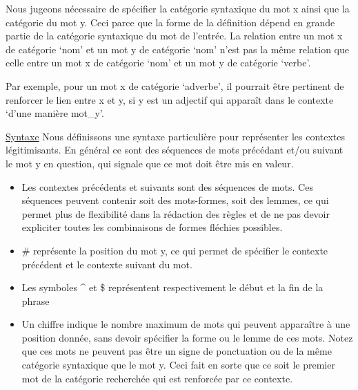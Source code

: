 Nous jugeons nécessaire de spécifier la catégorie syntaxique du mot x ainsi que 
la catégorie du mot y. Ceci parce que la forme de la définition dépend en grande 
partie de la catégorie syntaxique du mot de l'entrée. La relation entre un 
mot x de catégorie \lq{nom}\rq{} et un mot y de catégorie \lq{nom}\rq{} n'est pas la même 
relation que celle entre un mot x de catégorie \lq{nom}\rq{} et un mot y de 
catégorie \lq{verbe}\rq.

Par exemple, pour un mot x de catégorie \lq{adverbe}\rq, il pourrait être 
pertinent de renforcer le lien entre x et y, si y est un adjectif qui apparaît 
dans le contexte \lq{d'une manière mot\_y}\rq.

\underline{Syntaxe}\newline
Nous définissons une syntaxe particulière pour représenter les contextes 
légitimisants. En général ce sont des séquences de mots précédant et/ou suivant 
le mot y en question, qui signale que ce mot doit être mis en valeur.\newline

\begin{itemize}
    \item{Les contextes précédents et suivants sont des séquences de mots. Ces 
    séquences peuvent contenir soit des mots-formes, soit des lemmes, ce qui 
    permet plus de flexibilité dans la rédaction des règles et de ne pas devoir 
    expliciter toutes les combinaisons de formes fléchies possibles.}

    \item{\# représente la position du mot y, ce qui permet de spécifier le 
    contexte précédent et le contexte suivant du mot.}

    \item{Les symboles \string^ et \$ représentent respectivement le début et 
    la fin de la phrase}

    \item{Un chiffre indique le nombre maximum de mots qui peuvent apparaître à 
    une position donnée, sans devoir spécifier la forme ou le lemme de ces mots. 
    Notez que ces mots ne peuvent pas être un signe de ponctuation ou de la 
    même catégorie syntaxique que le mot y. Ceci fait en sorte que ce soit 
    le premier mot de la catégorie recherchée qui est renforcée par ce 
    contexte.}

\end{itemize}

